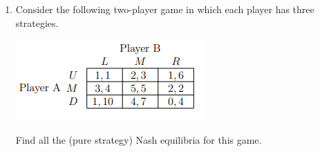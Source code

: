 \documentclass[11pt]{article}
\begin{document}
\begin{enumerate}
	\item Consider the following two-player game in which each player has three strategies.\\
	\begin{center}
		\includegraphics[scale=1.0]{Figure1.3}\\
	\end{center}
	Find all the (pure strategy) Nash equilibria for this game.\\
\end{enumerate}
\end{document}
